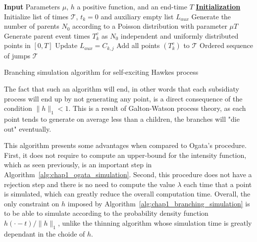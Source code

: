 \begin{algorithm}[ht]
    \SetAlgoLined
     \textbf{Input} Parameters $\mu$, $h$ a positive function, and an end-time $T$\;
     \textbf{\underline{Initialization}} Initialize list of times $\mathcal{T}$, $t_k=0$ and auxiliary empty list $L_{aux}$\;
     Generate the number of parents $N_0$ according to a Poisson distribution with parameter $\mu T$\;
     Generate parent event times $T_k^c$ as $N_0$ independent and uniformly distributed points in $[0, T]$\;
     Update $L_{aux} = C_{k,j}$\;
     Add all points $(T_k^c)$ to $\mathcal{T}$\;
     \Return Ordered sequence of jumps $\mathcal{T}$
     \caption{Branching simulation algorithm for self-exciting Hawkes process}
     \label{alg:chap1_branching_simulation}
    \end{algorithm}
The fact that such an algorithm will end, in other words that each subsidiaty process will end up by not generating any point, is a direct consequence of the condition $\|h\|_1 < 1$.
This is a result of Galton-Watson process theory, as each point tends to generate on average less than a children, the branches will "die out" eventually.

This algorithm presents some advantages when compared to Ogata's procedure.
First, it does not require to compute an upper-bound for the intensity function, which as seen previously, is an important step in Algorithm~\ref{alg:chap1_ogata_simulation}.
Second, this procedure does not have a rejection step and there is no need to compute the value $\lambda$ each time that a point is simulated, which can greatly reduce the overall computation time.
Overall, the only constraint on $h$ imposed by Algorithm~\ref{alg:chap1_branching_simulation} is to be able to simulate according to the probability density function $h(\cdot - t)/\|h\|_1$, unlike the thinning algorithm whose simulation time is greatly dependant in the choide of $h$.